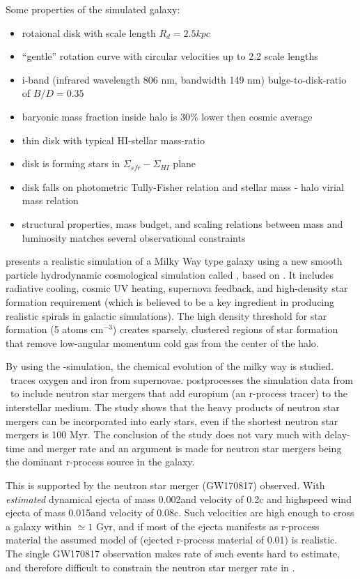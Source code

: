 Some properties of the simulated galaxy:
\begin{itemize}
\item{rotaional disk with scale length $R_d=2.5kpc$}
\item{``gentle'' rotation curve with circular velocities up to 2.2
  scale lengths}
\item{i-band (infrared wavelength 806 nm, bandwidth 149 nm)
  bulge-to-disk-ratio of $B/D=0.35$}
\item{baryonic mass fraction inside halo is 30\% lower then
  cosmic average}
\item{thin disk with typical HI-stellar mass-ratio}
\item{disk is forming stars in $\Sigma_{sfr}-\Sigma_{HI}$ plane}
\item{disk falls on photometric Tully-Fisher relation and
  stellar mass - halo virial mass relation}
\item{structural properties, mass budget, and scaling relations between mass and luminosity matches several observational constraints}
\end{itemize}



 presents a realistic simulation of a Milky Way type galaxy using a new smooth particle hydrodynamic cosmological simulation called \eris, based on \gasoline{}. It includes radiative cooling, cosmic UV heating, supernova feedback, and high-density star formation requirement (which is believed to be a key ingredient in producing realistic spirals in galactic simulations).
The high density threshold for star formation (5 atoms cm$^{-3}$) creates sparsely, clustered regions of star formation that remove low-angular momentum cold gas from the center of the halo. 

By using the \eris-simulation, the chemical evolution of the milky way is studied.
\eris\ traces oxygen and iron from supernovae.
 postprocesses the simulation data from \eris\ to include neutron star mergers that add europium (an r-process tracer) to the interstellar medium.
The study shows that the heavy products of neutron star mergers can be incorporated into early stars, even if the shortest neutron star mergers is 100 Myr. The conclusion of the study does not vary much with delay-time and merger rate and an argument is made for neutron star mergers being the dominant r-process source in the galaxy.

This is supported by the neutron star merger (GW170817) observed.
With \textit{estimated} dynamical ejecta of mass 0.002\msol and velocity of 0.2c and highspeed wind ejecta of mass 0.015\msol and velocity of 0.08c. Such velocities are high enough to cross a galaxy within $\simeq 1$ Gyr, and if most of the ejecta manifests as r-process material the assumed model of  (ejected r-process material of 0.01\msol) is realistic. The single GW170817 observation makes rate of such events hard to estimate, and therefore difficult to constrain the neutron star merger rate in \eris.

